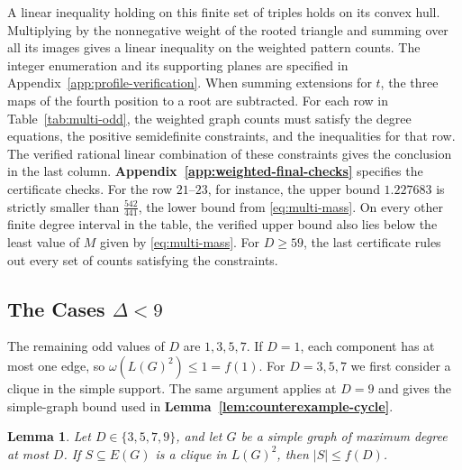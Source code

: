 \documentclass[preprint,11pt,numbers]{elsarticle-arxiv}
\numberwithin{equation}{section}
\newtheorem{lemma}[theorem]{Lemma}
\theoremstyle{definition}
\begin{document}
A linear inequality holding on this finite
set of triples holds on its convex hull. Multiplying by the
nonnegative weight of the rooted triangle and summing over all its
images gives a linear inequality on the weighted pattern counts.
The integer enumeration and its supporting planes are specified in
Appendix~\ref{app:profile-verification}. When summing extensions for
$t$, the three maps of the fourth position to a root are subtracted.
For each row in Table~\ref{tab:multi-odd}, the weighted graph counts must
satisfy the degree equations, the positive semidefinite constraints,
and the inequalities for that row. The verified rational linear
combination of these constraints gives the conclusion in the last
column. \textbf{Appendix~\ref{app:weighted-final-checks}} specifies the
certificate checks. For the row $21$--$23$, for instance, the
upper bound $1.227683$ is strictly smaller than $\frac{542}{441}$, the lower
bound from \eqref{eq:multi-mass}. On every other finite degree
interval in the table, the verified upper bound also lies below
the least value of $M$ given by \eqref{eq:multi-mass}. For
$D\geq59$, the last certificate rules out every set of counts
satisfying the constraints.

\subsection{The Cases \texorpdfstring{$\Delta<9$}{Delta < 9}}\label{subsec:exact-small-degree}

The remaining odd values of $D$ are $1,3,5,7$. If $D=1$, each
component has at most one edge, so $\omega(L(G)^2)\leq1=f(1)$.
For $D=3,5,7$ we first consider a clique in the simple support.
The same argument applies at $D=9$ and gives the simple-graph
bound used in \textbf{Lemma~\ref{lem:counterexample-cycle}}.

\begin{lemma}\label{lem:simple-small-support}
Let $D\in\{3,5,7,9\}$, and let $G$ be a simple graph of maximum
degree at most $D$. If $S\subseteq E(G)$ is a clique in $L(G)^2$,
then $|S|\leq f(D)$.
\end{lemma}
\end{document}
